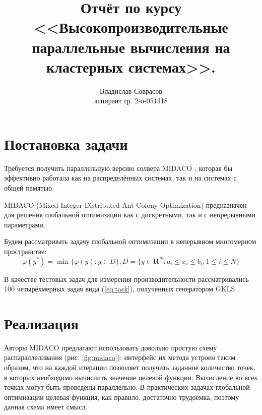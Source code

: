 \documentclass[a4paper]{article}
\begin{document}
\title{Отчёт по курсу <<Высокопроизводительные параллельные вычисления на кластерных системах>>.}
\author{Владислав Соврасов\\ аспирант гр. 2-о-051318}
\date{}
\maketitle

\section{Постановка задачи}

Требуется получить параллельную версию солвера MIDACO \cite{midacoURL}, которая
бы эффективно работала как на распределённых системах, так и на системах с общей памятью.

MIDACO (Mixed Integer Distributed Ant Colony Optimization) предназначен для решения
глобальной оптимизации как с дискретными, так и с непрерывными параметрами.

Будем рассматривать задачу глобальной оптимизации в неперывном многомерном пространстве:
\begin{displaymath}
\label{eq:task}
\varphi(y^*)=\min\{\varphi(y):y\in D\},D=\{y\in \mathbf{R}^N:a_i\leqslant x_i\leqslant{b_i}, 1\leqslant{i}\leqslant{N}\}
\end{displaymath}

В качестве тестовых задач для измерения производительности рассматривались 100
четырёхмерных задач вида (\ref{eq:task}), полученных генератором GKLS \cite{GKLS}.

\section{Реализация}

Авторы MIDACO предлагают использовать довольно простую схему распараллеливания (рис. \ref{fig:midaco}):
интерфейс их метода устроен таким образом, что на каждой итерации позволяет
получить заданное количество точек, в которых необходимо вычислить значение целевой
функции. Вычисление во всех точках могут быть проведены параллельно. В практических задачах глобальной оптимизации
целевая функция, как правило, достаточно трудоёмка, поэтому данная схема имеет смысл.
\end{document}
